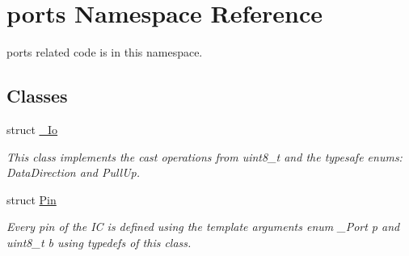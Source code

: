 \hypertarget{namespaceports}{}\section{ports Namespace Reference}
\label{namespaceports}


ports related code is in this namespace.  


\subsection*{Classes}
\begin{DoxyCompactItemize}
\item 
struct \hyperlink{structports_1_1__Io}{\+\_\+\+Io}
\begin{DoxyCompactList}\small\item\em This class implements the cast operations from uint8\+\_\+t and the typesafe enums\+: Data\+Direction and Pull\+Up. \end{DoxyCompactList}\item 
struct \hyperlink{structports_1_1Pin}{Pin}
\begin{DoxyCompactList}\small\item\em Every pin of the IC is defined using the template arguments {\ttfamily enum \+\_\+\+Port p} and {\ttfamily uint8\+\_\+t b} using {\ttfamily typedef}s of this class. \end{DoxyCompactList}\end{DoxyCompactItemize}
